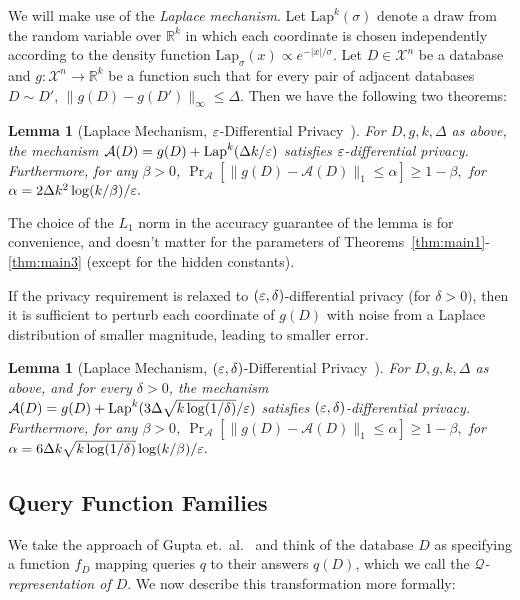 \documentclass[11pt]{article}
\newcommand\R{\mathbb{R}}
\newcommand\cA{\mathcal{A}}
\newcommand\cQ{\mathcal{Q}}
\newcommand\cX{\mathcal{X}}
\newcommand\san{\mathcal{A}}
\newcommand{\Prob}[2]{\Pr_{#1}\left[ #2 \right]}
\newtheorem{lemma}[theorem]{Lemma}
\theoremstyle{definition}
\begin{document}
We will make use of the \emph{Laplace mechanism}.  Let $\mathrm{Lap}^k(\sigma)$ denote a draw from the random variable over $\R^k$ in which each coordinate is chosen independently according to the density function $\mathrm{Lap}_{\sigma}(x) \propto e^{-|x|/\sigma}$.  Let $D \in \cX^n$ be a database and $g: \cX^n \to \R^k$ be a function such that for every pair of adjacent databases $D \sim D'$, $\| g(D) - g(D') \|_\infty \leq \Delta.$  Then we have the following two theorems:
\begin{lemma}[Laplace Mechanism, $\varepsilon$-Differential Privacy~\cite{DworkMcNiSm06}] \label{thm:laplacemech}
For $D, g, k, \Delta$ as above, the mechanism $\cA(D) = g(D) + \mathrm{Lap}^k(\Delta k/\eps)$ satisfies $\varepsilon$-differential privacy.  Furthermore, for any $\beta > 0$,
$\Prob{\san}{ \| g(D) - \cA(D) \|_1 \leq \alpha} \geq 1-\beta,$
for
$\alpha = 2 \Delta k^2 \log(k/\beta) / \varepsilon.$
\end{lemma}
The choice of the $L_1$ norm in the accuracy guarantee of the lemma is for convenience, and doesn't matter for the parameters of Theorems~\ref{thm:main1}-\ref{thm:main3} (except for the hidden constants).

\ifnum{}
If the privacy requirement is relaxed to $(\varepsilon,\delta)$-differential privacy (for $\delta > 0)$, then it is sufficient to perturb each coordinate of $g(D)$ with noise from a Laplace distribution of smaller magnitude, leading to smaller error. 
\begin{lemma}[Laplace Mechanism, $(\varepsilon, \delta)$-Differential Privacy~\cite{DinurNi03,DworkNi04,BlumDwMcNi05,DworkRoVa10}] \label{thm:advcomp}
For $D, g, k, \Delta$ as above, and for every $\delta > 0$, the mechanism $\cA(D) = g(D) + \mathrm{Lap}^k(3\Delta \sqrt{k\log(1/\delta)}/\eps)$ satisfies $(\varepsilon, \delta)$-differential privacy.
Furthermore, for any $\beta > 0$,
$\Prob{\san}{ \| g(D) - \cA(D) \|_1 \leq \alpha} \geq 1-\beta,$
for
$\alpha = 6\Delta k \sqrt{k\log(1/\delta)} \log(k/\beta) / \varepsilon.$
\end{lemma}
\else

\fi

\subsection{Query Function Families} \label{sec:countingqueries}

We take the approach of Gupta et.~al.~\cite{GuptaHaRoUl11} and think of the database $D$ as specifying a function $f_D$ mapping queries $q$ to their answers $q(D)$, which we call the \emph{$\cQ$-representation of $D$}. We now describe this transformation more formally:
\end{document}
